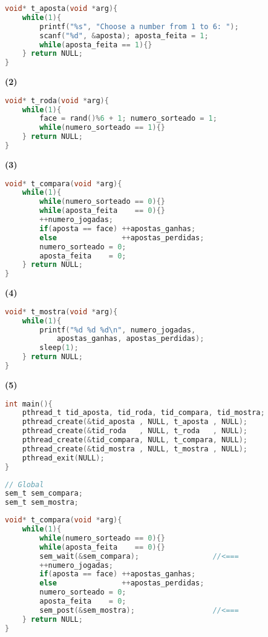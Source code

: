 \documentclass{sope}
\begin{document}
\begin{lstlisting}[language=C]
void* t_aposta(void *arg){
    while(1){
        printf("%s", "Choose a number from 1 to 6: ");
        scanf("%d", &aposta); aposta_feita = 1;
        while(aposta_feita == 1){}
    } return NULL;
}
\end{lstlisting}
\textbf{(2)}
\begin{lstlisting}[language=C]
void* t_roda(void *arg){
    while(1){
        face = rand()%6 + 1; numero_sorteado = 1;
        while(numero_sorteado == 1){}
    } return NULL;
}
\end{lstlisting}
\textbf{(3)}
\begin{lstlisting}[language=C]
void* t_compara(void *arg){
    while(1){
        while(numero_sorteado == 0){}
        while(aposta_feita    == 0){}
        ++numero_jogadas;
        if(aposta == face) ++apostas_ganhas;
        else               ++apostas_perdidas;
        numero_sorteado = 0;
        aposta_feita    = 0;
    } return NULL;
}
\end{lstlisting}
\textbf{(4)}
\begin{lstlisting}[language=C]
void* t_mostra(void *arg){
    while(1){
        printf("%d %d %d\n", numero_jogadas,
            apostas_ganhas, apostas_perdidas);
        sleep(1);
    } return NULL;
}
\end{lstlisting}
\textbf{(5)}
\begin{lstlisting}[language=C]
int main(){
    pthread_t tid_aposta, tid_roda, tid_compara, tid_mostra;
    pthread_create(&tid_aposta , NULL, t_aposta , NULL);
    pthread_create(&tid_roda   , NULL, t_roda   , NULL);
    pthread_create(&tid_compara, NULL, t_compara, NULL);
    pthread_create(&tid_mostra , NULL, t_mostra , NULL);
    pthread_exit(NULL);
}
\end{lstlisting}

\begin{lstlisting}[language=C]
// Global
sem_t sem_compara;
sem_t sem_mostra;
\end{lstlisting}

\begin{lstlisting}[language=C]
void* t_compara(void *arg){
    while(1){
        while(numero_sorteado == 0){}
        while(aposta_feita    == 0){}
        sem_wait(&sem_compara);                 //<===
        ++numero_jogadas;
        if(aposta == face) ++apostas_ganhas;
        else               ++apostas_perdidas;
        numero_sorteado = 0;
        aposta_feita    = 0;
        sem_post(&sem_mostra);                  //<===
    } return NULL;
}
\end{lstlisting}
\end{document}
